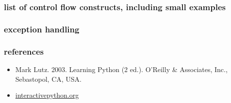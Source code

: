 \documentclass{beamer}
\begin{document}
\begin{frame}
\frametitle{list of control flow constructs, including small examples}
\framesubtitle{}
  
\end{frame}

\begin{frame}
\frametitle{exception handling}
\framesubtitle{}
  
\end{frame}


%         




\begin{frame}
 \frametitle{references}
 \begin{itemize}
  \item Mark Lutz. 2003. Learning Python (2 ed.). O'Reilly \& Associates, Inc., Sebastopol, CA, USA.
  \item \href{http://interactivepython.org}{interactivepython.org}
 \end{itemize}
\end{frame}
\end{document}

